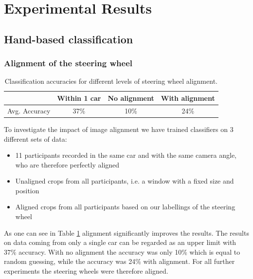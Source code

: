 \documentclass[10pt,twocolumn,letterpaper]{article}
\begin{document}
\section{Experimental Results}

\subsection{Hand-based classification}

	\subsubsection{Alignment of the steering wheel}
	\begin{table}
		\begin{tabular}{c|c|c|c}
			& Within 1 car & No alignment & With alignment \\ 
			\hline 
			Avg. Accuracy & 37\% & 10\% & 24\% \\ 
		\end{tabular} 
		\caption{Classification accuracies for different levels of steering wheel alignment.}
		\label{hand_estimation_alignment}
	\end{table}
	
	To investigate the impact of image alignment we have trained classifiers on 3 different sets of data:
	\begin{itemize}
		\item 11 participants recorded in the same car and with the same camera angle, who are therefore perfectly aligned
		\item Unaligned crops from all participants, i.e. a window with a fixed size and position
		\item Aligned crops from all participants based on our labellings of the steering wheel
	\end{itemize}
	As one can see in Table \ref{hand_estimation_alignment} alignment significantly improves the results. The results on data coming from only a single car can be regarded as an upper limit with 37\% accuracy. With no alignment the accuracy was only 10\% which is equal to random guessing, while the accuracy was 24\% with alignment. For all further experiments the steering wheels were therefore aligned.
\end{document}
